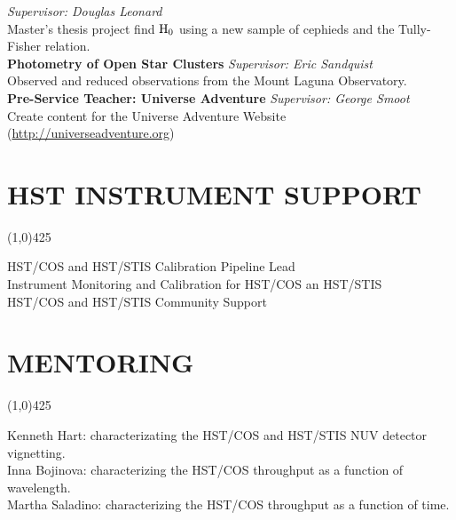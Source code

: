 \documentclass{res}
\begin{document}
\begin{resume}
\hspace*{265pt} \emph{Supervisor: Douglas Leonard}\\
\hspace*{24pt} Master's thesis project find $\rm{H_0}$ using a new sample of cephieds and the Tully-Fisher relation.   \\
{\bf Photometry of Open Star Clusters } \hspace{87pt}\emph{Supervisor: Eric Sandquist} \\
\hspace*{24pt} Observed and reduced observations from the Mount Laguna Observatory. \\ 
{\bf Pre-Service Teacher: Universe Adventure} \hspace{56pt}\emph{Supervisor: George Smoot} \\
\hspace*{24pt} Create content for the Universe Adventure Website ({\color{blue}\url{http://universeadventure.org}}) \\
\section{HST INSTRUMENT SUPPORT} 
\vspace{-.2in}
\begin{center}
\line(1,0){425}
\end{center}
\vspace{-.3in}
\vspace{0.1in}

HST/COS and HST/STIS Calibration Pipeline Lead \\
 Instrument Monitoring and Calibration for HST/COS an HST/STIS \\
 HST/COS and HST/STIS Community Support \\
\section{MENTORING} 
\vspace{-.2in}
\begin{center}
\line(1,0){425}
\end{center}
\vspace{-.3in}
\vspace{0.1in}
Kenneth Hart: characterizating the HST/COS and HST/STIS NUV detector vignetting. \\
Inna Bojinova: characterizing the HST/COS throughput as a function of wavelength. \\
Martha Saladino: characterizing the HST/COS throughput as a function of time. \\


\end{resume}
\end{document}
